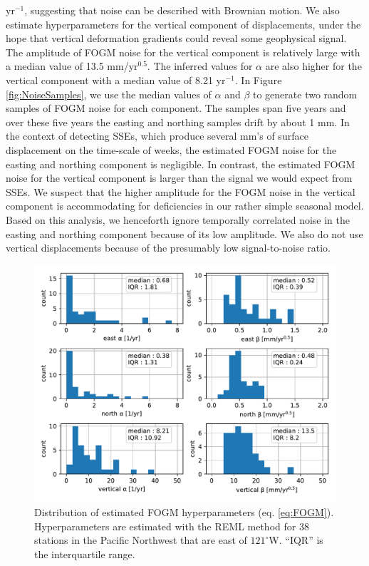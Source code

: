 \documentclass[extra,mreferee]{gji}
\begin{document}
yr$^{-1}$, suggesting that noise can be described with Brownian
motion. We also estimate hyperparameters for the vertical component of
displacements, under the hope that vertical deformation gradients
could reveal some geophysical signal. The amplitude of FOGM noise for
the vertical component is relatively large with a median value of 13.5
mm/yr$^{0.5}$.  The inferred values for $\alpha$ are also higher for
the vertical component with a median value of 8.21 yr$^{-1}$. In
Figure \ref{fig:NoiseSamples}, we use the median values of $\alpha$
and $\beta$ to generate two random samples of FOGM noise for each
component. The samples span five years and over these five years the
easting and northing samples drift by about 1 mm. In the context of
detecting SSEs, which produce several mm's of surface displacement on
the time-scale of weeks, the estimated FOGM noise for the easting and
northing component is negligible. In contrast, the estimated FOGM
noise for the vertical component is larger than the signal we would
expect from SSEs. We suspect that the higher amplitude for the FOGM
noise in the vertical component is accommodating for deficiencies in
our rather simple seasonal model. Based on this analysis, we
henceforth ignore temporally correlated noise in the easting and
northing component because of its low amplitude. We also do not use
vertical displacements because of the presumably low signal-to-noise
ratio.

\begin{figure}
\includegraphics{figures/noise/noise-params.pdf}
\caption{
Distribution of estimated FOGM hyperparameters (eq. \ref{eq:FOGM}).
Hyperparameters are estimated with the REML method for 38 stations in
the Pacific Northwest that are east of $121^\circ$W. ``IQR'' is the
interquartile range.
}   
\label{fig:NoiseParams}
\end{figure}
\end{document}
